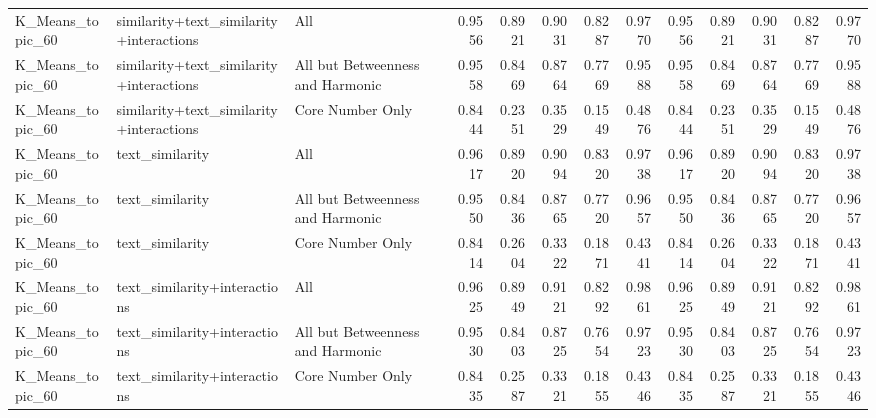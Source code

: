 \begin{tabular}{lllrrrrrrrrrr}
K_Means_topic_60 & similarity+text_similarity+interactions & All & 0.9556 & 0.8921 & 0.9031 & 0.8287 & 0.9770 & 0.9556 & 0.8921 & 0.9031 & 0.8287 & 0.9770 \\
K_Means_topic_60 & similarity+text_similarity+interactions & All but Betweenness and Harmonic & 0.9558 & 0.8469 & 0.8764 & 0.7769 & 0.9588 & 0.9558 & 0.8469 & 0.8764 & 0.7769 & 0.9588 \\
K_Means_topic_60 & similarity+text_similarity+interactions & Core Number Only & 0.8444 & 0.2351 & 0.3529 & 0.1549 & 0.4876 & 0.8444 & 0.2351 & 0.3529 & 0.1549 & 0.4876 \\
K_Means_topic_60 & text_similarity & All & 0.9617 & 0.8920 & 0.9094 & 0.8320 & 0.9738 & 0.9617 & 0.8920 & 0.9094 & 0.8320 & 0.9738 \\
K_Means_topic_60 & text_similarity & All but Betweenness and Harmonic & 0.9550 & 0.8436 & 0.8765 & 0.7720 & 0.9657 & 0.9550 & 0.8436 & 0.8765 & 0.7720 & 0.9657 \\
K_Means_topic_60 & text_similarity & Core Number Only & 0.8414 & 0.2604 & 0.3322 & 0.1871 & 0.4341 & 0.8414 & 0.2604 & 0.3322 & 0.1871 & 0.4341 \\
K_Means_topic_60 & text_similarity+interactions & All & 0.9625 & 0.8949 & 0.9121 & 0.8292 & 0.9861 & 0.9625 & 0.8949 & 0.9121 & 0.8292 & 0.9861 \\
K_Means_topic_60 & text_similarity+interactions & All but Betweenness and Harmonic & 0.9530 & 0.8403 & 0.8725 & 0.7654 & 0.9723 & 0.9530 & 0.8403 & 0.8725 & 0.7654 & 0.9723 \\
K_Means_topic_60 & text_similarity+interactions & Core Number Only & 0.8435 & 0.2587 & 0.3321 & 0.1855 & 0.4346 & 0.8435 & 0.2587 & 0.3321 & 0.1855 & 0.4346 \\
\bottomrule
\end{tabular}
